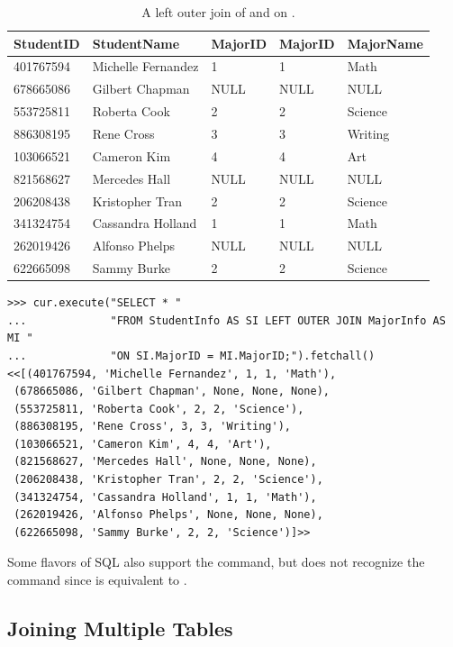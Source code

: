 \begin{table}[H]
\centering
\footnotesize
\begin{tabular}{|l|l|l|l|l|}
    \hline StudentID & StudentName & MajorID & MajorID & MajorName \\ \hline
    401767594 & Michelle Fernandez & 1 & 1 & Math \\
    678665086 & Gilbert Chapman & NULL & NULL & NULL \\
    553725811 & Roberta Cook & 2 & 2 & Science \\
    886308195 & Rene Cross & 3 & 3 & Writing \\
    103066521 & Cameron Kim & 4 & 4 & Art \\
    821568627 & Mercedes Hall & NULL & NULL & NULL \\
    206208438 & Kristopher Tran & 2 & 2 & Science \\
    341324754 & Cassandra Holland & 1 & 1 & Math \\
    262019426 & Alfonso Phelps & NULL & NULL & NULL \\
    622665098 & Sammy Burke & 2 & 2 & Science \\ \hline
\end{tabular}
\caption{A left outer join of  and  on .}
\label{table:sql2-left-outer-join}
\end{table}

\begin{lstlisting}
>>> cur.execute("SELECT * "
...             "FROM StudentInfo AS SI LEFT OUTER JOIN MajorInfo AS MI "
...             "ON SI.MajorID = MI.MajorID;").fetchall()
<<[(401767594, 'Michelle Fernandez', 1, 1, 'Math'),
 (678665086, 'Gilbert Chapman', None, None, None),
 (553725811, 'Roberta Cook', 2, 2, 'Science'),
 (886308195, 'Rene Cross', 3, 3, 'Writing'),
 (103066521, 'Cameron Kim', 4, 4, 'Art'),
 (821568627, 'Mercedes Hall', None, None, None),
 (206208438, 'Kristopher Tran', 2, 2, 'Science'),
 (341324754, 'Cassandra Holland', 1, 1, 'Math'),
 (262019426, 'Alfonso Phelps', None, None, None),
 (622665098, 'Sammy Burke', 2, 2, 'Science')]>>
\end{lstlisting}

Some flavors of SQL also support the  command, but  does not recognize the command since  is equivalent to .

\subsection*{Joining Multiple Tables} %

